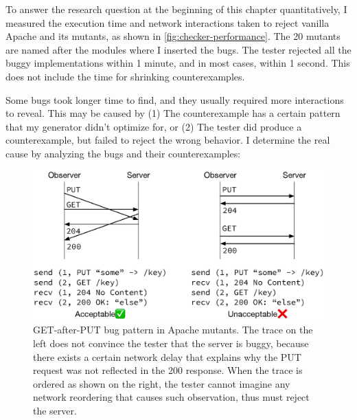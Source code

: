 To answer the research question at the beginning of this chapter quantitatively,
I measured the execution time and network interactions taken to reject vanilla
Apache and its mutants, as shown in \autoref{fig:checker-performance}.  The 20
mutants are named after the modules where I inserted the bugs.  The tester
rejected all the buggy implementations within 1 minute, and in most cases,
within 1 second.  This does not include the time for shrinking counterexamples.

Some bugs took longer time to find, and they usually required more interactions
to reveal.  This may be caused by (1) The counterexample has a certain pattern
that my generator didn't optimize for, or (2) The tester did produce a
counterexample, but failed to reject the wrong behavior.  I determine the real
cause by analyzing the bugs and their counterexamples:

\begin{figure}
  \includegraphics[width=.9\linewidth]{figures/http-put-bug}
  \caption[GET-after-PUT bug pattern in Apache mutants.]{GET-after-PUT bug
    pattern in Apache mutants.  The trace on the left does not convince the
    tester that the server is buggy, because there exists a certain network
    delay that explains why the PUT request was not reflected in the 200
    response.  When the trace is ordered as shown on the right, the tester
    cannot imagine any network reordering that causes such observation, thus
    must reject the server.}
  \label{fig:put-bug}
\end{figure}
  

